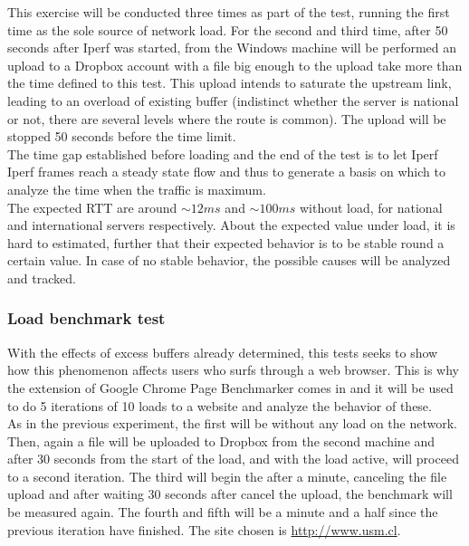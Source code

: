 This exercise will be conducted three times as part of the test, running the
first time as the sole source of network load. For the second and third time,
after 50 seconds after Iperf was started, from the Windows machine will be 
performed an upload to a Dropbox account with a file big enough to the upload 
take more than the time defined to this test. This upload intends to saturate 
the upstream link, leading to an overload of existing buffer (indistinct 
whether the server is national or not, there are several levels where the 
route is common). The upload will be stopped 50 seconds before the time limit.\\

The time gap established before loading and the end of the test is to let Iperf 
Iperf frames reach a steady state flow and thus to generate a basis on
which to analyze the time when the traffic is maximum.\\

The expected RTT are around $\sim12ms$ and $\sim100ms$ without load, for
national and international servers respectively. About the expected value under
load, it is hard to estimated, further that their expected behavior is 
to be stable round a certain value. In case of no stable behavior, the possible 
causes will be analyzed and tracked.\\

\subsubsection{Load benchmark test}
With the effects of excess buffers already determined, this tests seeks to show
how this phenomenon affects users who surfs through a web browser. This is why
the extension of Google Chrome Page Benchmarker comes in and it will be used to
do 5 iterations of 10 loads to a website and analyze the behavior of these. \\

As in the previous experiment, the first will be without any load on the
network. Then, again a file will be uploaded to Dropbox from the second machine
and after 30 seconds from the start of the load, and with the load active, will
proceed to a second iteration. The third will begin the after a minute,
canceling the file upload and after waiting 30 seconds after cancel the upload,
the benchmark will be measured again. The fourth and fifth will be a minute and
a half since the previous iteration have finished. The site chosen is
\url{http://www.usm.cl}.\\

